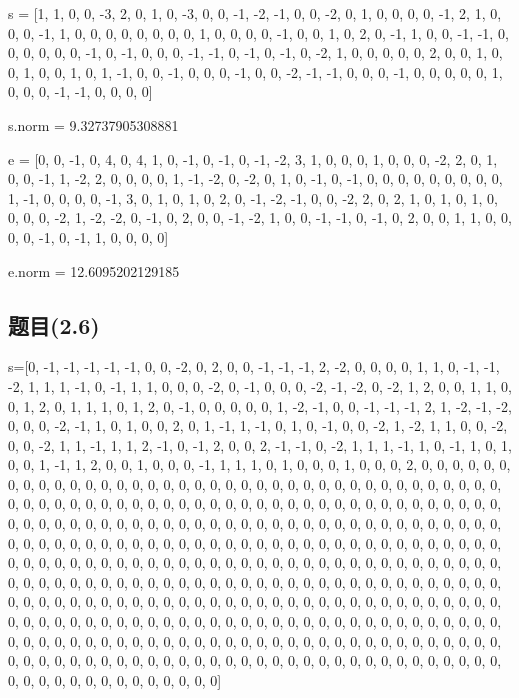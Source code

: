 \documentclass[12pt,a4paper]{article}
\numberwithin{equation}{section}
\begin{document}
s = [1, 1, 0, 0, -3, 2, 0, 1, 0, -3, 0, 0, -1, -2, -1, 0, 0, -2, 0, 1, 0, 0, 0, 0, -1, 2, 1, 0, 0, 0, -1, 1, 0, 0, 0, 0, 0, 0, 0, 0, 1, 0, 0, 0, 0, -1, 0, 0, 1, 0, 2, 0, -1, 1, 0, 0, -1, -1, 0, 0, 0, 0, 0, 0, -1, 0, -1, 0, 0, 0, -1, -1, 0, -1, 0, -1, 0, -2, 1, 0, 0, 0, 0, 0, 2, 0, 0, 1, 0, 0, 1, 0, 0, 1, 0, 1, -1, 0, 0, -1, 0, 0, 0, -1, 0, 0, -2, -1, -1, 0, 0, 0, -1, 0, 0, 0, 0, 0, 1, 0, 0, 0, -1, -1, 0, 0, 0, 0]

s.norm =  9.32737905308881

e = [0, 0, -1, 0, 4, 0, 4, 1, 0, -1, 0, -1, 0, -1, -2, 3, 1, 0, 0, 0, 1, 0, 0, 0, -2, 2, 0, 1, 0, 0, -1, 1, -2, 2, 0, 0, 0, 0, 1, -1, -2, 0, -2, 0, 1, 0, -1, 0, -1, 0, 0, 0, 0, 0, 0, 0, 0, 0, 1, -1, 0, 0, 0, 0, -1, 3, 0, 1, 0, 1, 0, 2, 0, -1, -2, -1, 0, 0, -2, 2, 0, 2, 1, 0, 1, 0, 1, 0, 0, 0, 0, -2, 1, -2, -2, 0, -1, 0, 2, 0, 0, -1, -2, 1, 0, 0, -1, -1, 0, -1, 0, 2, 0, 0, 1, 1, 0, 0, 0, 0, -1, 0, -1, 1, 0, 0, 0, 0]

e.norm = 12.6095202129185

\subsection{题目(2.6)}

s=[0, -1, -1, -1, -1, -1, 0, 0, -2, 0, 2, 0, 0, -1, -1, -1, 2, -2, 0, 0, 0, 0, 1, 1, 0, -1, -1, -2, 1, 1, 1, -1, 0, -1, 1, 1, 0, 0, 0, -2, 0, -1, 0, 0, 0, -2, -1, -2, 0, -2, 1, 2, 0, 0, 1, 1, 0, 0, 1, 2, 0, 1, 1, 1, 0, 1, 2, 0, -1, 0, 0, 0, 0, 0, 1, -2, -1, 0, 0, -1, -1, -1, 2, 1, -2, -1, -2, 0, 0, 0, -2, -1, 1, 0, 1, 0, 0, 2, 0, 1, -1, 1, -1, 0, 1, 0, -1, 0, 0, -2, 1, -2, 1, 1, 0, 0, -2, 0, 0, -2, 1, 1, -1, 1, 1, 2, -1, 0, -1, 2, 0, 0, 2, -1, -1, 0, -2, 1, 1, 1, -1, 1, 0, -1, 1, 0, 1, 0, 0, 1, -1, 1, 2, 0, 0, 1, 0, 0, 0, -1, 1, 1, 1, 0, 1, 0, 0, 0, 1, 0, 0, 0, 2, 0, 0, 0, 0, 0, 0, 0, 0, 0, 0, 0, 0, 0, 0, 0, 0, 0, 0, 0, 0, 0, 0, 0, 0, 0, 0, 0, 0, 0, 0, 0, 0, 0, 0, 0, 0, 0, 0, 0, 0, 0, 0, 0, 0, 0, 0, 0, 0, 0, 0, 0, 0, 0, 0, 0, 0, 0, 0, 0, 0, 0, 0, 0, 0, 0, 0, 0, 0, 0, 0, 0, 0, 0, 0, 0, 0, 0, 0, 0, 0, 0, 0, 0, 0, 0, 0, 0, 0, 0, 0, 0, 0, 0, 0, 0, 0, 0, 0, 0, 0, 0, 0, 0, 0, 0, 0, 0, 0, 0, 0, 0, 0, 0, 0, 0, 0, 0, 0, 0, 0, 0, 0, 0, 0, 0, 0, 0, 0, 0, 0, 0, 0, 0, 0, 0, 0, 0, 0, 0, 0, 0, 0, 0, 0, 0, 0, 0, 0, 0, 0, 0, 0, 0, 0, 0, 0, 0, 0, 0, 0, 0, 0, 0, 0, 0, 0, 0, 0, 0, 0, 0, 0, 0, 0, 0, 0, 0, 0, 0, 0, 0, 0, 0, 0, 0, 0, 0, 0, 0, 0, 0, 0, 0, 0, 0, 0, 0, 0, 0, 0, 0, 0, 0, 0, 0, 0, 0, 0, 0, 0, 0, 0, 0, 0, 0, 0, 0, 0, 0, 0, 0, 0, 0, 0, 0, 0, 0, 0, 0, 0, 0, 0, 0, 0, 0, 0, 0, 0, 0, 0, 0, 0, 0, 0, 0, 0, 0, 0, 0, 0, 0, 0, 0, 0, 0, 0, 0, 0, 0, 0, 0, 0, 0, 0, 0, 0, 0, 0, 0, 0, 0, 0, 0, 0, 0, 0, 0, 0, 0, 0, 0, 0, 0, 0, 0, 0, 0, 0, 0, 0, 0, 0, 0, 0, 0, 0, 0, 0, 0, 0, 0, 0, 0, 0, 0, 0, 0, 0, 0, 0, 0, 0, 0, 0, 0, 0, 0, 0, 0, 0, 0, 0, 0, 0, 0, 0, 0, 0, 0, 0, 0, 0, 0, 0, 0, 0, 0, 0, 0, 0]
\end{document}
